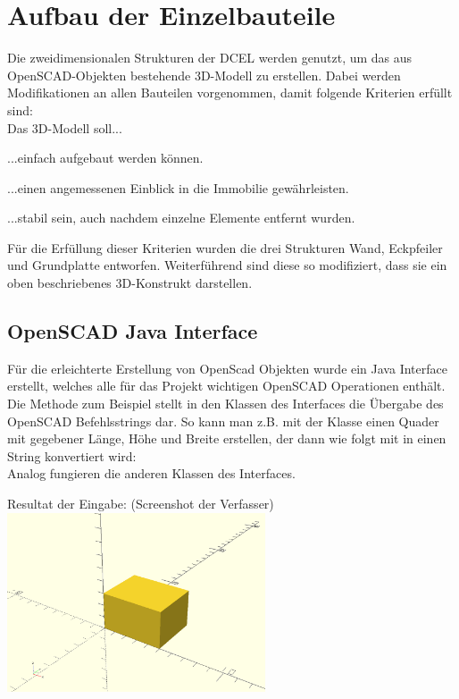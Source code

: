 \section{Aufbau der Einzelbauteile}
Die zweidimensionalen Strukturen der DCEL werden genutzt, um das aus OpenSCAD-Objekten bestehende 3D-Modell zu erstellen.
Dabei werden Modifikationen an allen Bauteilen vorgenommen, damit folgende Kriterien erfüllt sind:\\
Das 3D-Modell soll...

\begin{compactenum}
	\item ...einfach aufgebaut werden können.
	\item ...einen angemessenen Einblick in die Immobilie gewährleisten.
	\item ...stabil sein, auch nachdem einzelne Elemente entfernt wurden.
\end{compactenum}

Für die Erfüllung dieser Kriterien wurden die drei Strukturen Wand, Eckpfeiler und Grundplatte entworfen.
Weiterführend sind diese so modifiziert, dass sie ein oben beschriebenes 3D-Konstrukt darstellen.

\subsection{OpenSCAD Java Interface}
Für die erleichterte Erstellung von OpenScad Objekten wurde ein Java Interface  erstellt, welches alle für das Projekt wichtigen OpenSCAD Operationen enthält.
Die Methode  zum Beispiel stellt in den Klassen des Interfaces die Übergabe des OpenSCAD Befehlsstrings dar.
So kann man z.B. mit der Klasse  einen Quader mit gegebener Länge, Höhe und Breite erstellen, der dann wie folgt mit  in einen String konvertiert wird:
\\
Analog fungieren die anderen Klassen des Interfaces.

\begin{Bild}{Resultat der Eingabe:  (Screenshot der Verfasser)}
	\includegraphics[height = 200px]{Bilder/Quader}
\end{Bild}

